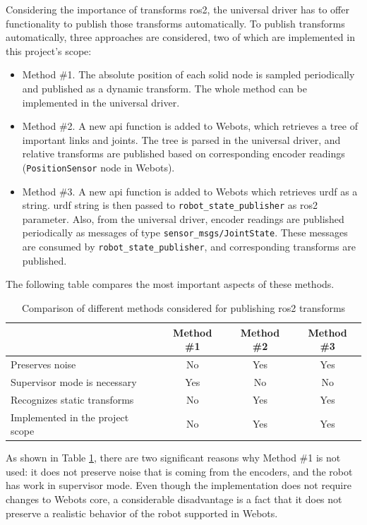 Considering the importance of transforms \ac{ros2}, the universal driver has to offer functionality to publish those transforms automatically.
To publish transforms automatically, three approaches are considered, two of which are implemented in this project's scope:
\begin{itemize}
    \item Method \#1. The absolute position of each solid node is sampled periodically and published as a dynamic transform. The whole method can be implemented in the universal driver.
    \item Method \#2. A new \ac{api} function is added to Webots, which retrieves a tree of important links and joints. The tree is parsed in the universal driver, and relative transforms are published based on corresponding encoder readings (\texttt{PositionSensor} node in Webots). 
    \item Method \#3. A new \ac{api} function is added to Webots which retrieves \ac{urdf} as a string. \ac{urdf} string is then passed to \texttt{robot\_state\_publisher} as \ac{ros2} parameter. Also, from the universal driver, encoder readings are published periodically as messages of type \texttt{sensor\_msgs/JointState}. These messages are consumed by \texttt{robot\_state\_publisher}, and corresponding transforms are published.
\end{itemize}

The following table compares the most important aspects of these methods.

\begin{table}[H]
    \centering
    \begin{tabular}{|l|c|c|c|}
        \hline
        & Method \#1 & Method \#2 & Method \#3  \\
        \hline
        Preserves noise & No & Yes & Yes \\
        \hline
        Supervisor mode is necessary & Yes & No & No \\
        \hline
        Recognizes static transforms & No & Yes & Yes \\
        \hline
        Implemented in the project scope & No & Yes & Yes \\
        \hline
    \end{tabular}
    \caption{Comparison of different methods considered for publishing \ac{ros2} transforms}
    \label{tab:generalization:transforms_comparison}
\end{table}

As shown in Table \ref{tab:generalization:transforms_comparison}, there are two significant reasons why Method \#1 is not used: it does not preserve noise that is coming from the encoders, and the robot has work in supervisor mode.
Even though the implementation does not require changes to Webots core, a considerable disadvantage is a fact that it does not preserve a realistic behavior of the robot supported in Webots.

